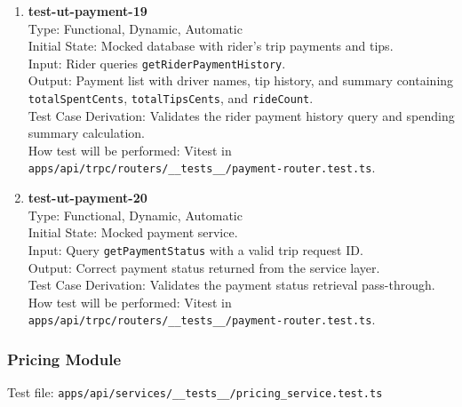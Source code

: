 \documentclass[12pt, titlepage]{article}
\begin{document}
\begin{enumerate}
\item \textbf{test-ut-payment-19}\\
Type: Functional, Dynamic, Automatic\\
Initial State: Mocked database with rider's trip payments and tips.\\
Input: Rider queries \texttt{getRiderPaymentHistory}.\\
Output: Payment list with driver names, tip history, and summary containing \texttt{totalSpentCents}, \texttt{totalTipsCents}, and \texttt{rideCount}.\\
Test Case Derivation: Validates the rider payment history query and spending summary calculation.\\
How test will be performed: Vitest in \texttt{apps/api/trpc/routers/\_\_tests\_\_/payment-router.test.ts}.\\

\item \textbf{test-ut-payment-20}\\
Type: Functional, Dynamic, Automatic\\
Initial State: Mocked payment service.\\
Input: Query \texttt{getPaymentStatus} with a valid trip request ID.\\
Output: Correct payment status returned from the service layer.\\
Test Case Derivation: Validates the payment status retrieval pass-through.\\
How test will be performed: Vitest in \texttt{apps/api/trpc/routers/\_\_tests\_\_/payment-router.test.ts}.\\
\end{enumerate}

\subsubsection{Pricing Module}

Test file: \texttt{apps/api/services/\_\_tests\_\_/pricing\_service.test.ts}
\end{document}
